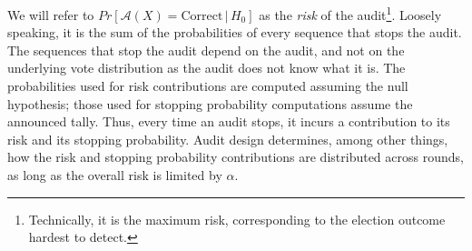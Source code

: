 We will refer to $Pr[\mathcal{A}(X) = \text{Correct} \,|\, H_0]$ as the {\em risk} of the audit\footnote{Technically, it is the maximum risk, corresponding to the election outcome hardest to detect.}. Loosely speaking, it is the sum of the probabilities of every sequence that stops the audit. The sequences that stop the audit depend on the audit, and not on the underlying vote distribution as the audit does not know what it is. The probabilities used for risk contributions are computed assuming the null hypothesis; those used for stopping probability computations assume the announced tally. Thus, every time an audit stops, it incurs a contribution to its risk and its stopping probability. Audit design determines, among other things, how the risk and stopping probability contributions are distributed across rounds, as long as the overall risk is limited by $\alpha$.  

